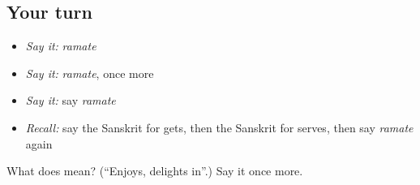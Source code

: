 \subsection*{Your turn}
\begin{itemize}
\raggedright
  \item \emph{Say it:} \emph{ramate}
  \item \emph{Say it:} \emph{ramate}, once more
  \item \emph{Say it:} say \emph{ramate}
  \item \emph{Recall:} say the Sanskrit for gets, then the Sanskrit for serves, then say \emph{ramate} again
\end{itemize}

\begin{tcolorbox}[breakable,colback=teal!4,colframe=teal!35!black,title={Before you move on}]
What does  mean? (\textquotedblleft{}Enjoys, delights in\textquotedblright{}.) Say it once more.
\end{tcolorbox}
